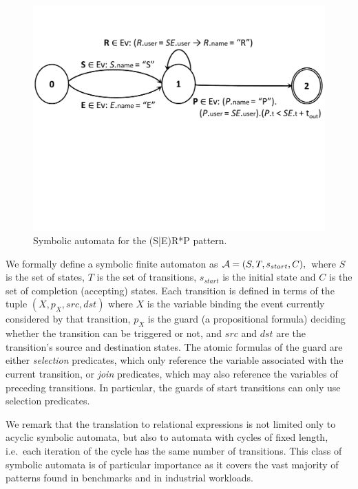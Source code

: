 \begin{figure}[t]
	\centering
	\includegraphics[clip, trim=0cm 10cm 0cm 3cm,width=\columnwidth]
	{graphs/example_sm3.pdf}
	\caption{Symbolic automata for the (S|E)R*P pattern.}
	\label{fig:serp_pattern}
\end{figure}


We formally define a symbolic finite automaton as $\mathcal{A} = (S, T, s_{start}, C),$ 
where $S$ is the set of states, $T$ is the set of transitions, $s_{start}$ is 
the initial state and $C$ is the set of completion (accepting) states.
Each transition is defined in terms of the tuple $(X, p_X, src, dst)$ where $X$ 
is the variable binding the event currently considered by that transition, 
$p_X$ is the guard (a propositional formula) 
deciding whether the transition can be triggered or not, and $src$ and $dst$ 
are the transition's source and destination states.  
The atomic formulas of the guard are either {\em selection} predicates, which 
only reference the variable associated with the current transition,
or {\em join} predicates, which may also reference the variables of preceding 
transitions.
In particular, the guards of start transitions can only use selection 
predicates.  


We remark that the translation to relational expressions is not limited only to 
acyclic symbolic automata, but also to automata with cycles of fixed length, 
i.e.\ each iteration of the cycle has the same number of transitions.
This class of symbolic automata is of particular importance as it covers the 
vast majority of patterns found in benchmarks and in industrial workloads.  




